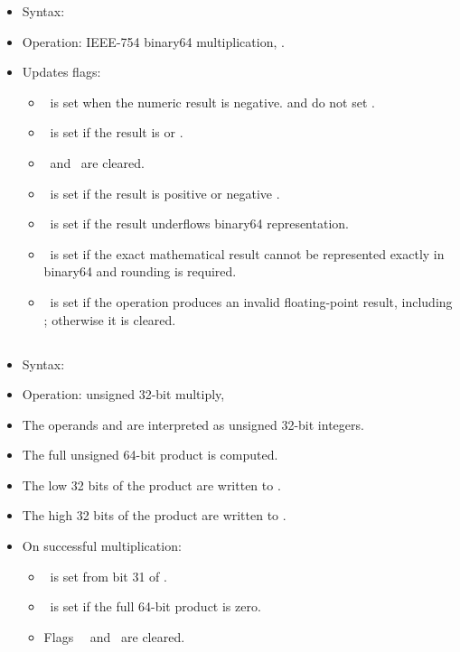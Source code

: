 \begin{itemize}
\item Syntax: 
\item Operation: IEEE-754 binary64 multiplication,
      .
\item Updates flags:
      \begin{itemize}
      \item \flagN\ is set when the numeric result is negative.
             and  do not set \flagN.
      \item \flagZ\ is set if the result is  or .
      \item \flagC\ and \flagV\ are cleared.
      \item \flagI\ is set if the result is positive or negative .
      \item \flagU\ is set if the result underflows binary64 representation.
      \item \flagX\ is set if the exact mathematical result cannot be represented
            exactly in binary64 and rounding is required.
      \item \flagE\ is set if the operation produces an invalid floating-point
          result, including ; otherwise it is cleared.
      \end{itemize}
\end{itemize}

\subsection{}

\begin{itemize}
  \item Syntax: 
  \item Operation: unsigned 32-bit multiply,
  \item The operands  and  are interpreted as unsigned 32-bit
        integers.
  \item The full unsigned 64-bit product is computed.
  \item The low 32 bits of the product are written to .
  \item The high 32 bits of the product are written to .
  \item On successful multiplication:
  \begin{itemize}
  \item \flagN\ is set from bit 31 of .
  \item \flagZ\ is set if the full 64-bit product is zero.
  \item Flags \flagC\ \flagV\ and \flagE\ are cleared.
  \end{itemize}
\end{itemize}

